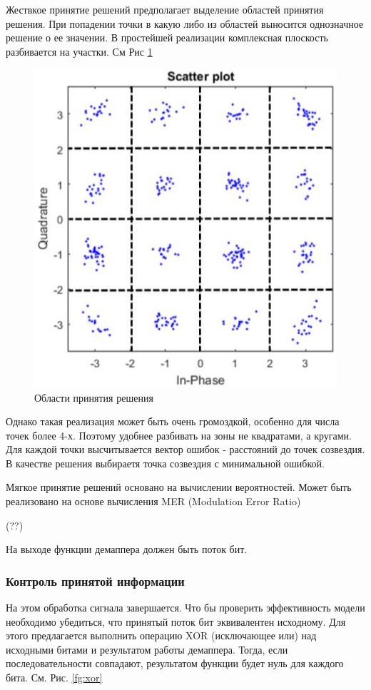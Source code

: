 Жествкое принятие решений предполагает выделение областей принятия решения. При попадении точки в какую либо из областей выносится однозначное решение о ее значении. 
В простейшей реализации комплексная плоскость разбивается на участки. 
См Рис  \ref{fg:demap}
\begin{figure}[h!]
\centering
\includegraphics[]{demap}
\caption{Области принятия решения} \label{fg:demap}
\end{figure}

Однако такая реализация может быть очень громоздкой, особенно для числа точек более 4-х.
Поэтому удобнее разбивать на зоны не квадратами, а кругами. 
Для каждой точки высчитывается вектор ошибок - расстояний до точек созвездия. 
В качестве решения выбираетя точка созвездия с минимальной ошибкой.

Мягкое принятие решений основано на вычислении вероятностей. 
Может быть реализовано на основе вычисления MER (Modulation Error Ratio)

(??)

На выходе функции демаппера должен быть поток бит.

\subsubsection*{Контроль принятой информации} 

На этом обработка сигнала завершается. 
Что бы проверить эффективность модели необходимо убедиться, что принятый поток бит эквивалентен исходному. 
Для этого предлагается выполнить операцию XOR (исключающее или) над исходными битами и результатом работы демаппера.
Тогда, если последовательности совпадают, результатом функции будет нуль для каждого бита.
См. Рис.  \ref{fg:xor}

